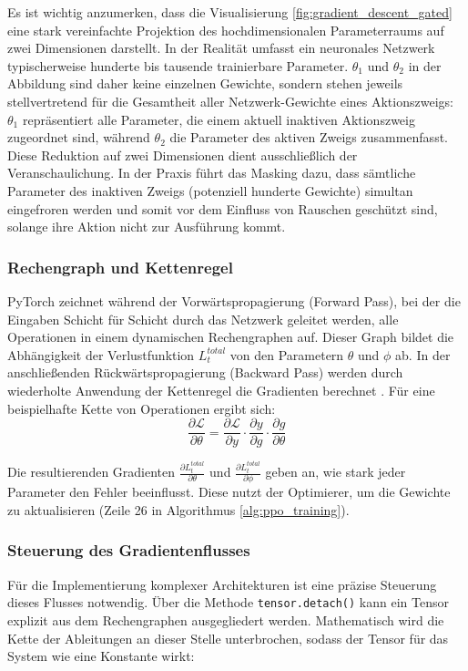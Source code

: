 Es ist wichtig anzumerken, dass die Visualisierung \ref{fig:gradient_descent_gated} eine stark vereinfachte Projektion des hochdimensionalen Parameterraums auf zwei Dimensionen darstellt. In der Realität umfasst ein neuronales Netzwerk typischerweise hunderte bis tausende trainierbare Parameter. $\theta_1$ und $\theta_2$ in der Abbildung sind daher keine einzelnen Gewichte, sondern stehen jeweils stellvertretend für die Gesamtheit aller Netzwerk\hyp{}Gewichte eines Aktionszweigs: $\theta_1$ repräsentiert alle Parameter, die einem aktuell inaktiven Aktionszweig zugeordnet sind, während $\theta_2$ die Parameter des aktiven Zweigs zusammenfasst. Diese Reduktion auf zwei Dimensionen dient ausschließlich der Veranschaulichung. In der Praxis führt das Masking dazu, dass sämtliche Parameter des inaktiven Zweigs (potenziell hunderte Gewichte) simultan eingefroren werden und somit vor dem Einfluss von Rauschen geschützt sind, solange ihre Aktion nicht zur Ausführung kommt.


\subsubsection*{Rechengraph und Kettenregel} 
PyTorch zeichnet während der Vorwärtspropagierung (Forward Pass), bei der die Eingaben Schicht für Schicht durch das Netzwerk geleitet werden, alle Operationen in einem dynamischen Rechengraphen auf. Dieser Graph bildet die Abhängigkeit der Verlustfunktion $L_t^{total}$ von den Parametern $\theta$ und $\phi$ ab. In der anschließenden Rückwärtspropagierung (Backward Pass) werden durch wiederholte Anwendung der Kettenregel die Gradienten berechnet \cite[Kap. 1]{PyTorch_Fundamentals}. Für eine beispielhafte Kette von Operationen ergibt sich:
\begin{equation} 
    \frac{\partial \mathcal{L}}{\partial \theta} = \frac{\partial \mathcal{L}}{\partial y} \cdot \frac{\partial y}{\partial g} \cdot \frac{\partial g}{\partial \theta} 
\end{equation}

Die resultierenden Gradienten $\frac{\partial L_t^{total}}{\partial \theta}$ und $\frac{\partial L_t^{total}}{\partial \phi}$ geben an, wie stark jeder Parameter den Fehler beeinflusst. Diese nutzt der Optimierer, um die Gewichte zu aktualisieren (Zeile 26 in Algorithmus \ref{alg:ppo_training}).

\subsubsection*{Steuerung des Gradientenflusses} 
Für die Implementierung komplexer Architekturen ist eine präzise Steuerung dieses Flusses notwendig.
Über die Methode \texttt{tensor.detach()} kann ein Tensor explizit aus dem Rechengraphen ausgegliedert werden. Mathematisch wird die Kette
der Ableitungen an dieser Stelle unterbrochen, sodass der Tensor für das System wie eine Konstante wirkt:

